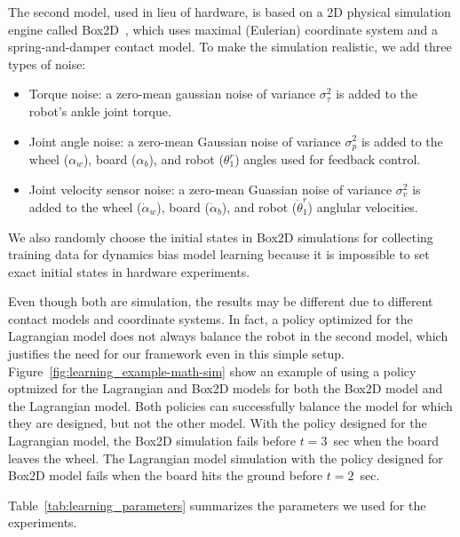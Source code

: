 The second model, used in lieu of hardware, is based on a 2D physical
simulation engine called 
Box2D~\cite{bib-box2d}, which uses maximal (Eulerian) coordinate system and
a spring-and-damper contact model. %
To make the simulation realistic, we add three types of noise:
\begin{itemize}
\item Torque noise: a zero-mean gaussian noise of variance
	  $\sigma_{\tau}^2$ is added to the robot's ankle joint torque.
\item Joint angle noise: a zero-mean Gaussian noise of variance
	  $\sigma_{p}^2$ is added to the wheel ($\alpha_w$), board
	  ($\alpha_b$), and robot ($\theta_1^r$) angles used for feedback
	  control. 
\item Joint velocity sensor noise: a zero-mean Guassian noise of
	  variance $\sigma_v^2$ is added to the wheel ($\dot{\alpha}_w$),
	  board ($\dot{\alpha}_b$), and robot ($\dot{\theta}_1^r$)
	  anglular velocities.
\end{itemize}
We also randomly choose the initial states in Box2D simulations for
collecting training data for dynamics bias model learning because it is
impossible to set exact initial states in hardware experiments.

Even though both are simulation, the results may be different due to
different contact models and coordinate systems.
In fact, a policy optimized for the Lagrangian model does not always balance
the robot in the second model, which justifies the need for our
framework even in this simple setup.
Figure~\ref{fig:learning_example-math-sim} show an example of using a policy
optmized for the Lagrangian and Box2D models for both the Box2D model
and the Lagrangian model.
Both policies can successfully balance the model for which they are
designed, but not the other model.
With the policy designed for the Lagrangian model, the Box2D simulation
fails before $t=3$~sec when the board leaves the wheel.
The Lagrangian model simulation with the policy designed for Box2D model
fails when the board hits the ground before $t=2$~sec.

Table~\ref{tab:learning_parameters} summarizes the parameters we used for the
experiments.

